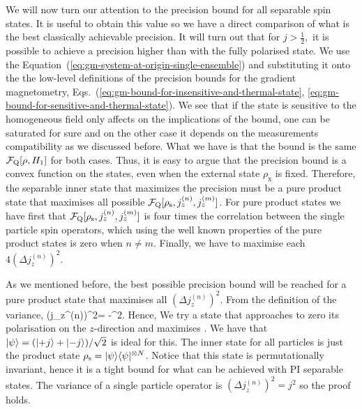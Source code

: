 We will now turn our attention to
the precision bound for all separable spin states.
It is useful to obtain this value so we have a direct comparison of what is
the best classically achievable precision.
It will turn out that for $j>\frac{1}{2},$ it is possible
to achieve a precision higher than with the fully polarised state.
We use the Equation~(\ref{eq:gm-system-at-origin-single-ensemble}) and substituting it onto the the low-level definitions of the precision bounds for the gradient magnetometry, Eqs.~(\ref{eq:gm-bound-for-insensitive-and-thermal-state}, \ref{eq:gm-bound-for-sensitive-and-thermal-state}).
We see that if the state is sensitive to the homogeneous field only affects on the implications of the bound, one can be saturated for sure and on the other case it depends on the measurements compatibility as we discussed before.
What we have is that the bound is the same $\mathcal{F}_{\textnormal{Q}}[{\textstyle \rho, H_1}]$ for both cases.
Thus, it is easy to argue that the precision bound is a convex function on the states, even when the external state $\rho_{\text{x}}$ is fixed.
Therefore, the separable inner state that maximizes the precision must be a pure product state that maximises all possible $\mathcal{F}_{\textnormal{Q}}[{\textstyle \rho_{\text{s}}, j_z^{(n)}, j_z^{(m)}}]$.%
For pure product states we have first that $\mathcal{F}_{\textnormal{Q}}[{\textstyle \rho_{\text{s}}, j_z^{(n)}, j_z^{(m)}}]$ is four times the correlation between the single particle spin operators, which using the well known properties of the pure product states is  zero when $n \neq m$.
Finally, we have to maximise each $4(\Delta j_z^{(n)})^2$.


As we mentioned before, the best possible precision bound will be reached for a pure product state that maximises all $(\Delta j_z^{(n)})^2$.
From the definition of the variance,
\be
(\Delta j_z^{(n)})^2=
-^2.
\ee
Hence, We try a state that approaches to zero its polarisation on the $z$-direction and maximises .
We have that  $\vert{\psi}\rangle=(\vert{+j}\rangle+\vert{-j}\rangle)/\sqrt{2}$ is ideal for this.
The inner state for all particles is just the product state $\rho_{\text{s}} =\vert{\psi}\rangle\langle{\psi}\vert^{\otimes N}$.
Notice that this state is permutationally invariant, hence it is a tight bound for what can be achieved with PI separable states.
The variance of a single particle operator is $(\Delta j_z^{(n)})^2=j^2$ so the proof holds.

